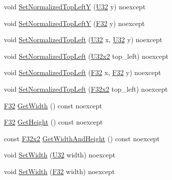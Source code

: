\begin{DoxyCompactItemize}
\item 
void \hyperlink{classmage_1_1_viewport_ab186a0208f26d2900d536c84d0292229}{Set\+Normalized\+Top\+LeftY} (\hyperlink{namespacemage_a41c104c036fba3756a74e19f793eeaa1}{U32} y) noexcept
\item 
void \hyperlink{classmage_1_1_viewport_a055de66fa911b8a017ad79a4b479187c}{Set\+Normalized\+Top\+LeftY} (\hyperlink{namespacemage_aa97e833b45f06d60a0a9c4fc22ae02c0}{F32} y) noexcept
\item 
void \hyperlink{classmage_1_1_viewport_a4ab75412c331b74baeb54b3f537383cd}{Set\+Normalized\+Top\+Left} (\hyperlink{namespacemage_a41c104c036fba3756a74e19f793eeaa1}{U32} x, \hyperlink{namespacemage_a41c104c036fba3756a74e19f793eeaa1}{U32} y) noexcept
\item 
void \hyperlink{classmage_1_1_viewport_a56a14e677fdc0ecd2ee5e6568e27a633}{Set\+Normalized\+Top\+Left} (\hyperlink{namespacemage_a88e05bff0300120c013285d3dcad95c5}{U32x2} top\+\_\+left) noexcept
\item 
void \hyperlink{classmage_1_1_viewport_a6f85757d3b7e09e9e7cb72c201fd0cd4}{Set\+Normalized\+Top\+Left} (\hyperlink{namespacemage_aa97e833b45f06d60a0a9c4fc22ae02c0}{F32} x, \hyperlink{namespacemage_aa97e833b45f06d60a0a9c4fc22ae02c0}{F32} y) noexcept
\item 
void \hyperlink{classmage_1_1_viewport_affccf7a7033463ba8d2b9cc4c9ae790b}{Set\+Normalized\+Top\+Left} (\hyperlink{namespacemage_aa87237ad091f5cd7da612b8523fc108f}{F32x2} top\+\_\+left) noexcept
\item 
\hyperlink{namespacemage_aa97e833b45f06d60a0a9c4fc22ae02c0}{F32} \hyperlink{classmage_1_1_viewport_a851c6322e8ee31af58309a3c0f382d10}{Get\+Width} () const noexcept
\item 
\hyperlink{namespacemage_aa97e833b45f06d60a0a9c4fc22ae02c0}{F32} \hyperlink{classmage_1_1_viewport_ac763e089bbff0ee3f67b47c0501637ef}{Get\+Height} () const noexcept
\item 
const \hyperlink{namespacemage_aa87237ad091f5cd7da612b8523fc108f}{F32x2} \hyperlink{classmage_1_1_viewport_a334f6fe7e86069e0ac14b71ebc543307}{Get\+Width\+And\+Height} () const noexcept
\item 
void \hyperlink{classmage_1_1_viewport_a13f5587df2929ca0368e4434a3a45753}{Set\+Width} (\hyperlink{namespacemage_a41c104c036fba3756a74e19f793eeaa1}{U32} width) noexcept
\item 
void \hyperlink{classmage_1_1_viewport_a377016fb769c86677d7a17c2b19960f3}{Set\+Width} (\hyperlink{namespacemage_aa97e833b45f06d60a0a9c4fc22ae02c0}{F32} width) noexcept

\end{DoxyCompactItemize}
